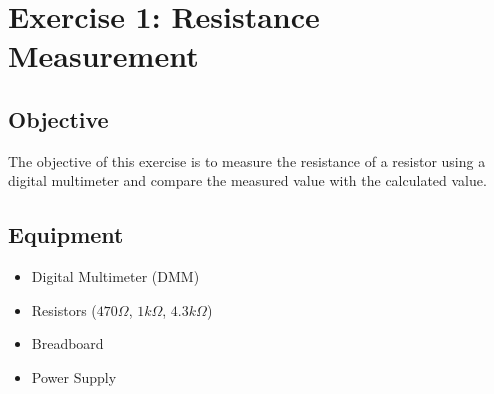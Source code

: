 
\section{Exercise 1: Resistance Measurement}

\subsection{Objective}
The objective of this exercise is to measure the resistance of a resistor using a digital multimeter and compare the measured value with the calculated value.

\subsection{Equipment}
\begin{itemize}
    \item Digital Multimeter (DMM)
    \item Resistors ($470\Omega$, $1k\Omega$, $4.3k\Omega$)
    \item Breadboard
    \item Power Supply
\end{itemize}

\newpage
\thispagestyle{plain}

